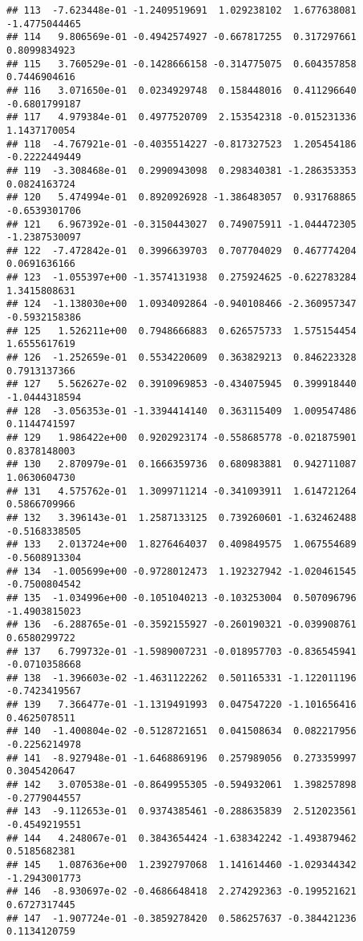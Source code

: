 \documentclass[
]{article}
\begin{document}
\begin{verbatim}
## 113  -7.623448e-01 -1.2409519691  1.029238102  1.677638081 -1.4775044465
## 114   9.806569e-01 -0.4942574927 -0.667817255  0.317297661  0.8099834923
## 115   3.760529e-01 -0.1428666158 -0.314775075  0.604357858  0.7446904616
## 116   3.071650e-01  0.0234929748  0.158448016  0.411296640 -0.6801799187
## 117   4.979384e-01  0.4977520709  2.153542318 -0.015231336  1.1437170054
## 118  -4.767921e-01 -0.4035514227 -0.817327523  1.205454186 -0.2222449449
## 119  -3.308468e-01  0.2990943098  0.298340381 -1.286353353  0.0824163724
## 120   5.474994e-01  0.8920926928 -1.386483057  0.931768865 -0.6539301706
## 121   6.967392e-01 -0.3150443027  0.749075911 -1.044472305 -1.2387530097
## 122  -7.472842e-01  0.3996639703  0.707704029  0.467774204  0.0691636166
## 123  -1.055397e+00 -1.3574131938  0.275924625 -0.622783284  1.3415808631
## 124  -1.138030e+00  1.0934092864 -0.940108466 -2.360957347 -0.5932158386
## 125   1.526211e+00  0.7948666883  0.626575733  1.575154454  1.6555617619
## 126  -1.252659e-01  0.5534220609  0.363829213  0.846223328  0.7913137366
## 127   5.562627e-02  0.3910969853 -0.434075945  0.399918440 -1.0444318594
## 128  -3.056353e-01 -1.3394414140  0.363115409  1.009547486  0.1144741597
## 129   1.986422e+00  0.9202923174 -0.558685778 -0.021875901  0.8378148003
## 130   2.870979e-01  0.1666359736  0.680983881  0.942711087  1.0630604730
## 131   4.575762e-01  1.3099711214 -0.341093911  1.614721264  0.5866709966
## 132   3.396143e-01  1.2587133125  0.739260601 -1.632462488 -0.5168338505
## 133   2.013724e+00  1.8276464037  0.409849575  1.067554689 -0.5608913304
## 134  -1.005699e+00 -0.9728012473  1.192327942 -1.020461545 -0.7500804542
## 135  -1.034996e+00 -0.1051040213 -0.103253004  0.507096796 -1.4903815023
## 136  -6.288765e-01 -0.3592155927 -0.260190321 -0.039908761  0.6580299722
## 137   6.799732e-01 -1.5989007231 -0.018957703 -0.836545941 -0.0710358668
## 138  -1.396603e-02 -1.4631122262  0.501165331 -1.122011196 -0.7423419567
## 139   7.366477e-01 -1.1319491993  0.047547220 -1.101656416  0.4625078511
## 140  -1.400804e-02 -0.5128721651  0.041508634  0.082217956 -0.2256214978
## 141  -8.927948e-01 -1.6468869196  0.257989056  0.273359997  0.3045420647
## 142   3.070538e-01 -0.8649955305 -0.594932061  1.398257898 -0.2779044557
## 143  -9.112653e-01  0.9374385461 -0.288635839  2.512023561 -0.4549219551
## 144   4.248067e-01  0.3843654424 -1.638342242 -1.493879462  0.5185682381
## 145   1.087636e+00  1.2392797068  1.141614460 -1.029344342 -1.2943001773
## 146  -8.930697e-02 -0.4686648418  2.274292363 -0.199521621  0.6727317445
## 147  -1.907724e-01 -0.3859278420  0.586257637 -0.384421236  0.1134120759

\end{verbatim}
\end{document}
